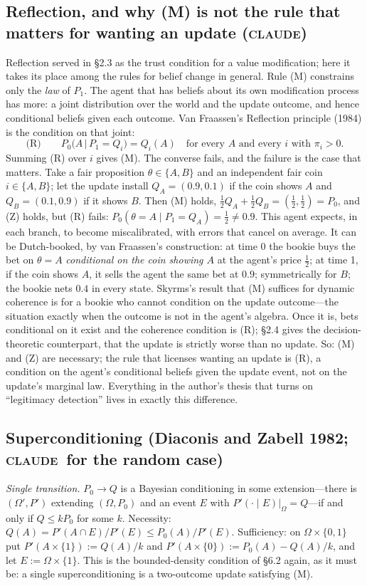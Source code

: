 \documentclass[11pt,a4paper]{article}
\newcommand{\CLAUDE}{\textnormal{\scshape claude}}
\begin{document}
\subsection{Reflection, and why (M) is not the rule that matters for wanting an update (\CLAUDE)}
Reflection served in \S2.3 as the trust condition for a value modification; here it takes its place among the rules for belief change in general. Rule (M) constrains only the \emph{law} of $P_1$. The agent that has beliefs about its own modification process has more: a joint distribution over the world and the update outcome, and hence conditional beliefs given each outcome. Van Fraassen's Reflection principle (1984) is the condition on that joint:
\[
\text{(R)}\qquad P_0\bigl(A \,\big|\, P_1 = Q_i\bigr) = Q_i(A) \quad\text{for every } A \text{ and every } i \text{ with } \pi_i > 0.
\]
Summing (R) over $i$ gives (M). The converse fails, and the failure is the case that matters. Take a fair proposition $\theta \in \{A, B\}$ and an independent fair coin $i \in \{A, B\}$; let the update install $Q_A = (0.9, 0.1)$ if the coin shows $A$ and $Q_B = (0.1, 0.9)$ if it shows $B$. Then (M) holds, $\tfrac12 Q_A + \tfrac12 Q_B = (\tfrac12, \tfrac12) = P_0$, and (Z) holds, but (R) fails: $P_0(\theta = A \mid P_1 = Q_A) = \tfrac12 \ne 0.9$. This agent expects, in each branch, to become miscalibrated, with errors that cancel on average. It can be Dutch-booked, by van Fraassen's construction: at time 0 the bookie buys the bet on $\theta = A$ \emph{conditional on the coin showing $A$} at the agent's price $\tfrac12$; at time 1, if the coin shows $A$, it sells the agent the same bet at $0.9$; symmetrically for $B$; the bookie nets $0.4$ in every state. Skyrms's result that (M) suffices for dynamic coherence is for a bookie who cannot condition on the update outcome---the situation exactly when the outcome is not in the agent's algebra. Once it is, bets conditional on it exist and the coherence condition is (R); \S2.4 gives the decision-theoretic counterpart, that the update is strictly worse than no update. So: (M) and (Z) are necessary; the rule that licenses wanting an update is (R), a condition on the agent's conditional beliefs given the update event, not on the update's marginal law. Everything in the author's thesis that turns on ``legitimacy detection'' lives in exactly this difference.

\subsection{Superconditioning (Diaconis and Zabell 1982; \CLAUDE\ for the random case)}
\emph{Single transition.} $P_0 \to Q$ is a Bayesian conditioning in some extension---there is $(\Omega', P')$ extending $(\Omega, P_0)$ and an event $E$ with $P'(\cdot \mid E)|_\Omega = Q$---if and only if $Q \le kP_0$ for some $k$. Necessity: $Q(A) = P'(A \cap E)/P'(E) \le P_0(A)/P'(E)$. Sufficiency: on $\Omega \times \{0, 1\}$ put $P'(A \times \{1\}) := Q(A)/k$ and $P'(A \times \{0\}) := P_0(A) - Q(A)/k$, and let $E := \Omega \times \{1\}$. This is the bounded-density condition of \S6.2 again, as it must be: a single superconditioning is a two-outcome update satisfying (M).
\end{document}
